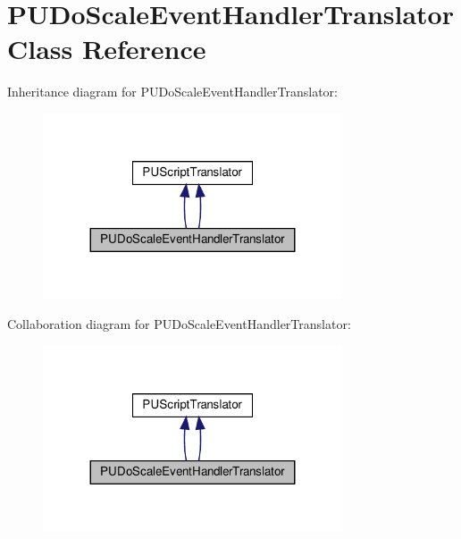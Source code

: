 \hypertarget{classPUDoScaleEventHandlerTranslator}{}\section{P\+U\+Do\+Scale\+Event\+Handler\+Translator Class Reference}
\label{classPUDoScaleEventHandlerTranslator}


Inheritance diagram for P\+U\+Do\+Scale\+Event\+Handler\+Translator\+:
\nopagebreak
\begin{figure}[H]
\begin{center}
\leavevmode
\includegraphics[width=251pt]{classPUDoScaleEventHandlerTranslator__inherit__graph}
\end{center}
\end{figure}


Collaboration diagram for P\+U\+Do\+Scale\+Event\+Handler\+Translator\+:
\nopagebreak
\begin{figure}[H]
\begin{center}
\leavevmode
\includegraphics[width=251pt]{classPUDoScaleEventHandlerTranslator__coll__graph}
\end{center}
\end{figure}
